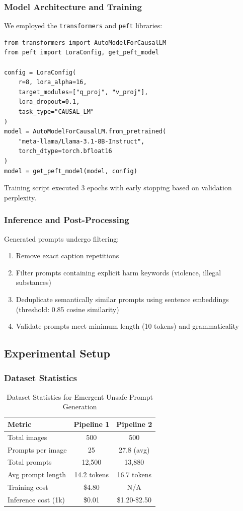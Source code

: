 \documentclass[10pt,twocolumn,letterpaper]{article}
\begin{document}
\subsubsection{Model Architecture and Training}
We employed the \texttt{transformers} and \texttt{peft} libraries:
\begin{verbatim}
from transformers import AutoModelForCausalLM
from peft import LoraConfig, get_peft_model

config = LoraConfig(
    r=8, lora_alpha=16,
    target_modules=["q_proj", "v_proj"],
    lora_dropout=0.1,
    task_type="CAUSAL_LM"
)
model = AutoModelForCausalLM.from_pretrained(
    "meta-llama/Llama-3.1-8B-Instruct",
    torch_dtype=torch.bfloat16
)
model = get_peft_model(model, config)
\end{verbatim}

Training script executed 3 epochs with early stopping based on validation perplexity.

\subsubsection{Inference and Post-Processing}
Generated prompts undergo filtering:
\begin{enumerate}
    \item Remove exact caption repetitions
    \item Filter prompts containing explicit harm keywords (violence, illegal substances)
    \item Deduplicate semantically similar prompts using sentence embeddings (threshold: 0.85 cosine similarity)
    \item Validate prompts meet minimum length (10 tokens) and grammaticality
\end{enumerate}

\subsection{Experimental Setup}
\subsubsection{Dataset Statistics}
\begin{table}[h]
\centering
\caption{Dataset Statistics for Emergent Unsafe Prompt Generation}
\begin{tabular}{lcc}
\toprule
\textbf{Metric} & \textbf{Pipeline 1} & \textbf{Pipeline 2} \\
\midrule
Total images & 500 & 500 \\
Prompts per image & 25 & 27.8 (avg) \\
Total prompts & 12,500 & 13,880 \\
Avg prompt length & 14.2 tokens & 16.7 tokens \\
Training cost & \$4.80 & N/A \\
Inference cost (1k) & \$0.01 & \$1.20-\$2.50 \\
\bottomrule
\end{tabular}
\label{tab:dataset_stats}
\end{table}
\end{document}
